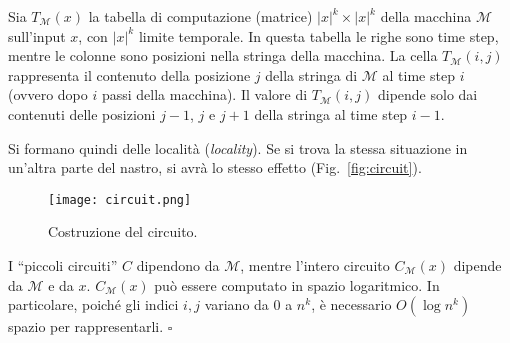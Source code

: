 \begin{enumerate}
\begin{center}
    \end{center}
    Sia $T_\mathcal{M}(x)$ la tabella di computazione (matrice) $|x|^k\times |x|^k$ della macchina $\mathcal{M}$ sull'input $x$, con $|x|^k$ limite temporale. In questa tabella le righe sono time step, mentre le colonne sono posizioni nella stringa della macchina. La cella $T_\mathcal{M}(i,j)$ rappresenta il contenuto della posizione $j$ della stringa di $\mathcal{M}$ al time step $i$ (ovvero dopo $i$ passi della macchina). Il valore di $T_\mathcal{M}(i,j)$ dipende solo dai contenuti delle posizioni $j-1$, $j$ e $j+1$ della stringa al time step $i-1$.

    Si formano quindi delle località (\emph{locality}). Se si trova la stessa situazione in un'altra parte del nastro, si avrà lo stesso effetto (Fig.~\vref{fig:circuit}).
    
    \begin{figure}[htb]
        \centering
        \texttt{[image: circuit.png]}
        \caption{Costruzione del circuito.}
        \label{fig:circuit}
    \end{figure}
    I ``piccoli circuiti'' $C$ dipendono da $\mathcal{M}$, mentre l'intero circuito $C_\mathcal{M}(x)$ dipende da $\mathcal{M}$ e da $x$. $C_\mathcal{M}(x)$ può essere computato in spazio logaritmico. In particolare, poiché gli indici $i,j$ variano da 0 a $n^k$, è necessario $O(\log n^k)$ spazio per rappresentarli. \hfill$\square$
\end{enumerate}

